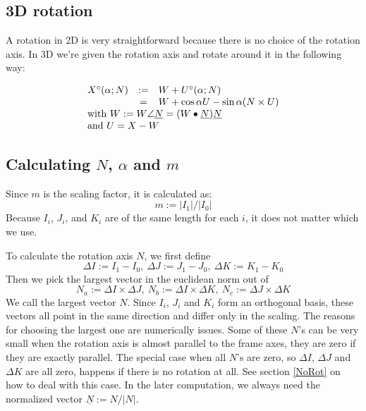 \documentclass[journal, letterpaper]{IEEEtran}
\begin{document}
\subsection{3D rotation}
A rotation in 2D is very straightforward because there is no choice of the rotation axis. In 3D we're given the rotation axis and rotate around it in the following way:

\begin{equation}
\begin{array}{lcl}
 X^{\circ}(\alpha; N) &:=& W + U^{\circ}(\alpha; N) \\
                        & =& W + \cos \alpha U - \sin \alpha (N \times U) \\
 \multicolumn{3}{l}{\text{with } W := W\angle\underline{N} = (W\bullet\underline{N})\underline{N}} \\
 \multicolumn{3}{l}{\text{and } U = X-W}
\end{array}
\label{eq:Rotation}
\end{equation}

\subsection{Calculating $N$, $\alpha$ and $m$}
Since $m$ is the scaling factor, it is calculated as:
\begin{equation}
 m := |I_1| / |I_0|
\label{eq:m}
\end{equation}
Because $I_i$, $J_i$, and $K_i$ are of the same length for each $i$, it does not matter which we use. 
 
To calculate the rotation axis $N$, we first define 
\begin{equation}
\Delta I:= I_1 - I_0, \ \Delta J := J_1 - J_0, \ \Delta K := K_1 - K_0
\end{equation}
Then we pick the largest vector in the euclidean norm out of 
\begin{equation}
N_a := \Delta I \times \Delta J, \ N_b := \Delta I \times \Delta K, \ N_c := \Delta J \times \Delta K
\end{equation}
We call the largest vector $N$. Since $I_i$, $J_i$ and $K_i$ form an orthogonal basis, these vectors all point in the same direction and differ only in the scaling. The reasons for choosing the largest one are numerically issues. Some of these $N$'s can be very small when the rotation axis is almost parallel to the frame axes, they are zero if they are exactly parallel. The special case when all $N$'s are zero, so $\Delta I$, $\Delta J$ and $\Delta K$ are all zero, happens if there is no rotation at all. See section \ref{NoRot} on how to deal with this case. In the later computation, we always need the normalized vector $\underline{N}:=N/|N|$.
  
\end{document}
